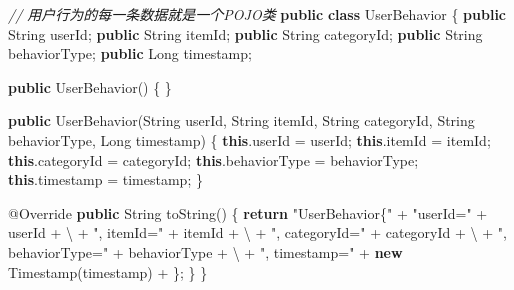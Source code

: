 \documentclass[cn,11pt,chinese]{elegantbook}
\newenvironment{Shaded}{}{}
\newcommand{\AttributeTok}[1]{\textcolor[rgb]{0.49,0.56,0.16}{#1}}
\newcommand{\BuiltInTok}[1]{#1}
\newcommand{\CharTok}[1]{\textcolor[rgb]{0.25,0.44,0.63}{#1}}
\newcommand{\CommentTok}[1]{\textcolor[rgb]{0.38,0.63,0.69}{\textit{#1}}}
\newcommand{\FunctionTok}[1]{\textcolor[rgb]{0.02,0.16,0.49}{#1}}
\newcommand{\KeywordTok}[1]{\textcolor[rgb]{0.00,0.44,0.13}{\textbf{#1}}}
\newcommand{\NormalTok}[1]{#1}
\newcommand{\StringTok}[1]{\textcolor[rgb]{0.25,0.44,0.63}{#1}}
\begin{document}
\begin{Shaded}
\begin{Highlighting}[]
\CommentTok{// 用户行为的每一条数据就是一个POJO类}
\KeywordTok{public} \KeywordTok{class}\NormalTok{ UserBehavior \{}
    \KeywordTok{public} \BuiltInTok{String}\NormalTok{ userId;}
    \KeywordTok{public} \BuiltInTok{String}\NormalTok{ itemId;}
    \KeywordTok{public} \BuiltInTok{String}\NormalTok{ categoryId;}
    \KeywordTok{public} \BuiltInTok{String}\NormalTok{ behaviorType;}
    \KeywordTok{public} \BuiltInTok{Long}\NormalTok{ timestamp;}

    \KeywordTok{public} \FunctionTok{UserBehavior}\NormalTok{() \{}
\NormalTok{    \}}

    \KeywordTok{public} \FunctionTok{UserBehavior}\NormalTok{(}\BuiltInTok{String}\NormalTok{ userId, }\BuiltInTok{String}\NormalTok{ itemId, }\BuiltInTok{String}\NormalTok{ categoryId, }\BuiltInTok{String}\NormalTok{ behaviorType, }\BuiltInTok{Long}\NormalTok{ timestamp) \{}
        \KeywordTok{this}\NormalTok{.}\FunctionTok{userId}\NormalTok{ = userId;}
        \KeywordTok{this}\NormalTok{.}\FunctionTok{itemId}\NormalTok{ = itemId;}
        \KeywordTok{this}\NormalTok{.}\FunctionTok{categoryId}\NormalTok{ = categoryId;}
        \KeywordTok{this}\NormalTok{.}\FunctionTok{behaviorType}\NormalTok{ = behaviorType;}
        \KeywordTok{this}\NormalTok{.}\FunctionTok{timestamp}\NormalTok{ = timestamp;}
\NormalTok{    \}}

    \AttributeTok{@Override}
    \KeywordTok{public} \BuiltInTok{String} \FunctionTok{toString}\NormalTok{() \{}
        \KeywordTok{return} \StringTok{"UserBehavior\{"}\NormalTok{ +}
                \StringTok{"userId=\textquotesingle{}"}\NormalTok{ + userId + }\CharTok{\textquotesingle{}\textbackslash{}\textquotesingle{}\textquotesingle{}}\NormalTok{ +}
                \StringTok{", itemId=\textquotesingle{}"}\NormalTok{ + itemId + }\CharTok{\textquotesingle{}\textbackslash{}\textquotesingle{}\textquotesingle{}}\NormalTok{ +}
                \StringTok{", categoryId=\textquotesingle{}"}\NormalTok{ + categoryId + }\CharTok{\textquotesingle{}\textbackslash{}\textquotesingle{}\textquotesingle{}}\NormalTok{ +}
                \StringTok{", behaviorType=\textquotesingle{}"}\NormalTok{ + behaviorType + }\CharTok{\textquotesingle{}\textbackslash{}\textquotesingle{}\textquotesingle{}}\NormalTok{ +}
                \StringTok{", timestamp="}\NormalTok{ + }\KeywordTok{new} \BuiltInTok{Timestamp}\NormalTok{(timestamp) +}
                \CharTok{\textquotesingle{}\}\textquotesingle{}}\NormalTok{;}
\NormalTok{    \}}
\NormalTok{\}}
\end{Highlighting}
\end{Shaded}
\end{document}
